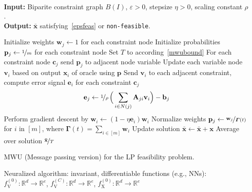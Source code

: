 \documentclass[6pt, DIV=12]{scrartcl}
\theoremstyle{definition}
\newcommand{\bbR}{\ensuremath{\mathbb{R}}}
\renewcommand{\vec}[1]{\mathbf{#1}}
\begin{document}
\begin{algorithm}[H]\mbox{\hfill}
	\\\textbf{Input:} Biparite constraint graph $B(I)$, $\varepsilon > 0$,  stepsize $\eta > 0$, scaling constant $\rho$. \\
	\textbf{Output:} $\vec{\bar{x}}$ satisfying~\cref{epsfeas} or \texttt{non-feasible}.
	\begin{algorithmic}[1]
		\State Initialize weights $\vec{w}_j \leftarrow 1$ for each constraint node
		\State Initialize probabilities $\vec{p}_j \leftarrow \nicefrac{1}{m}$ for each constraint node
		\State Set $T$ to according~\cref{mwubound}
		\State For each constraint node $\vec{c}_j$ send $\vec{p}_j$ to adjacent node variable 
		\Statex
		\State Update each variable node $\vec{v}_i$ based on output $\vec{x}_i$ of oracle using $\vec{p}$
		\State Send $\vec{v}_i$ to each adjacent constraint, compute error signal $\vec{e}_i$ for each constraint $\vec{c}_j$
		\begin{equation*}
		\vec{e}_j \leftarrow \nicefrac{1}{\rho}\,\Big(\sum_{i \in N(j)} \label{key}\vec{A}_{ji}  \vec{v}_i \Big) - \vec{b}_j   
		\end{equation*}
		\State Perform gradient descent by $\vec{w}_i \leftarrow (1 - \eta \vec{e}_i) \vec{w}_i$ 
		\State Normalize weights $\vec{p}_j \leftarrow \nicefrac{\vec{w}_j}{\boldsymbol{\Gamma}(t)} $  for $i$ in $[m]$, where $\boldsymbol{\Gamma}(t) = \sum_{i \in [m]} \vec{w}_i$
		\State Update solution $\vec{\bar{x}} \leftarrow \vec{\bar{x}} + \vec{x}$
		\EndFor
		\State \Return Average over solution $ \nicefrac{\vec{\bar{x}}}{T}$
	\end{algorithmic}
	\caption{MWU (Message passing version) for the LP feasibility problem.}
	\label{alg:as}
\end{algorithm}

Neuralized algorithm:
invariant, differentiable functions (e.g., NNs):
$f_{\text{V}}^{(0)}\colon \bbR^d \to \bbR^e$, $f_{\text{V}}^{(C)}\colon \bbR^d \to \bbR^e$, $f_{\text{X}}^{(0)}\colon \bbR^d \to \bbR^e$
\end{document}
